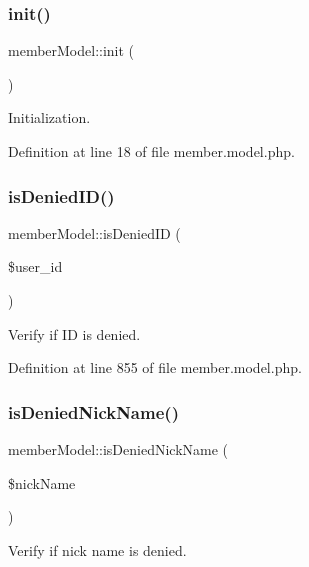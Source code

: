 \subsubsection{\texorpdfstring{init()}{init()}}
{\footnotesize\ttfamily member\+Model\+::init (\begin{DoxyParamCaption}{ }\end{DoxyParamCaption})}



Initialization. 



Definition at line 18 of file member.\+model.\+php.

\mbox{\label{classmemberModel_ac0ba5ea00ecf3113fe50947243a6be20}} 
\subsubsection{\texorpdfstring{is\+Denied\+I\+D()}{isDeniedID()}}
{\footnotesize\ttfamily member\+Model\+::is\+Denied\+ID (\begin{DoxyParamCaption}\item[{}]{\$user\+\_\+id }\end{DoxyParamCaption})}



Verify if ID is denied. 



Definition at line 855 of file member.\+model.\+php.

\mbox{\label{classmemberModel_a8d1d937176417d4d29a48404feb7f32f}} 
\subsubsection{\texorpdfstring{is\+Denied\+Nick\+Name()}{isDeniedNickName()}}
{\footnotesize\ttfamily member\+Model\+::is\+Denied\+Nick\+Name (\begin{DoxyParamCaption}\item[{}]{\$nick\+Name }\end{DoxyParamCaption})}



Verify if nick name is denied. 



